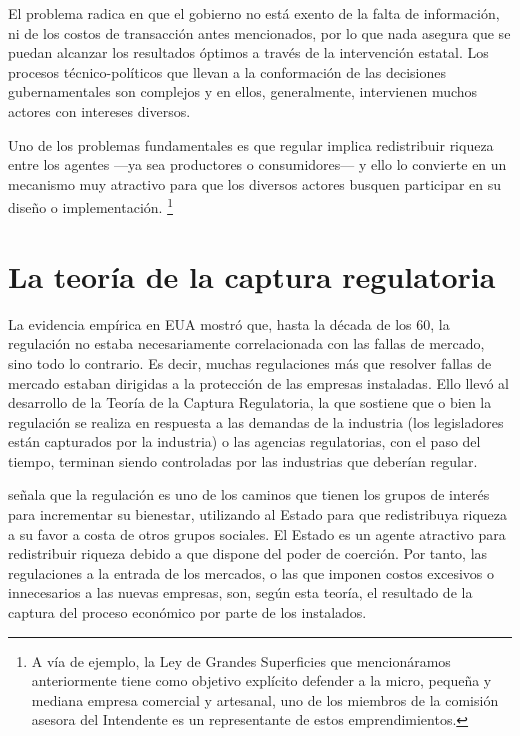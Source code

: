 \documentclass[
  12pt,
  spanish,
]{book}
\begin{document}
El problema radica en que el gobierno no está exento de la falta de
información, ni de los costos de transacción antes mencionados, por lo
que nada asegura que se puedan alcanzar los resultados óptimos a través
de la intervención estatal. Los procesos técnico-políticos que llevan a
la conformación de las decisiones gubernamentales son complejos y en
ellos, generalmente, intervienen muchos actores con intereses diversos.

Uno de los problemas fundamentales es que regular implica redistribuir
riqueza entre los agentes ---ya sea productores o consumidores--- y ello
lo convierte en un mecanismo muy atractivo para que los diversos actores
busquen participar en su diseño o implementación. \footnote{A vía de
  ejemplo, la Ley de Grandes Superficies que mencionáramos anteriormente
  tiene como objetivo explícito defender a la micro, pequeña y mediana
  empresa comercial y artesanal, uno de los miembros de la comisión
  asesora del Intendente es un representante de estos emprendimientos.}

\hypertarget{la-teoruxeda-de-la-captura-regulatoria}{%
\section{La teoría de la captura
regulatoria}\label{la-teoruxeda-de-la-captura-regulatoria}}

La evidencia empírica en EUA mostró que, hasta la década de los 60, la
regulación no estaba necesariamente correlacionada con las fallas de
mercado, sino todo lo contrario. Es decir, muchas regulaciones más que
resolver fallas de mercado estaban dirigidas a la protección de las
empresas instaladas. Ello llevó al desarrollo de la Teoría de la Captura
Regulatoria, la que sostiene que o bien la regulación se realiza en
respuesta a las demandas de la industria (los legisladores están
capturados por la industria) o las agencias regulatorias, con el paso
del tiempo, terminan siendo controladas por las industrias que deberían
regular.

\citet{Stigler1971} señala que la regulación es uno de los caminos que
tienen los grupos de interés para incrementar su bienestar, utilizando
al Estado para que redistribuya riqueza a su favor a costa de otros
grupos sociales. El Estado es un agente atractivo para redistribuir
riqueza debido a que dispone del poder de coerción. Por tanto, las
regulaciones a la entrada de los mercados, o las que imponen costos
excesivos o innecesarios a las nuevas empresas, son, según esta teoría,
el resultado de la captura del proceso económico por parte de los
instalados.
\end{document}
